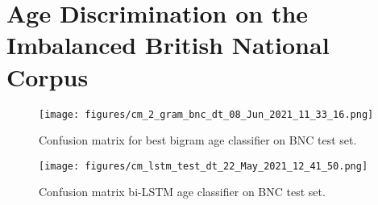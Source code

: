\section{Age Discrimination on the Imbalanced British National Corpus }
\label{age_disc_bnc}

\begin{figure}[H]
    \centering
    \texttt{[image: figures/cm\_2\_gram\_bnc\_dt\_08\_Jun\_2021\_11\_33\_16.png]}
    \caption{Confusion matrix for best bigram age classifier on BNC test set.}
    \label{fig:cm_bigram_bnc}
\end{figure}

\begin{figure}[H]
    \centering
    \texttt{[image: figures/cm\_lstm\_test\_dt\_22\_May\_2021\_12\_41\_50.png]}
    \caption{Confusion matrix bi-LSTM age classifier on BNC test set.}
    \label{fig:cm_lstm_bnc}
\end{figure}

